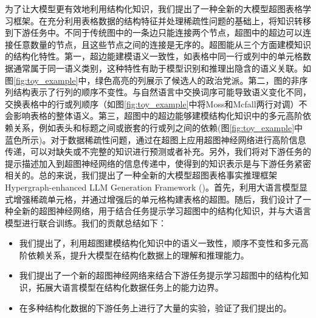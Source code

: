 \begin{CJK}{UTF8}{gkai}
为了让大模型更有效地利用结构化知识，我们提出了一种全新的大模型超图表格学习框架。在充分利用表格数据的结构特征并处理稀疏性问题的基础上，将知识转移到下游任务中。不同于传统图中的一条边只能连接两个节点，超图中的超边可以连接任意数量的节点，且这些节点之间的连接是无序的。超图能从三个方面建模知识的结构化特性。第一，超边能建模语义一致性，如表格中同一行或列中的单元格数据通常属于同一语义类别，这种特性有助于模型识别和推理出隐含的语义关联。如图\ref{fig:toy_example}中，绿色高亮的列展示了候选人的政治党派。第二，图的非序列结构表示了行列的顺序不变性。与自然语言中交换词序可能导致语义变化不同，交换表格中的行或列顺序（如图\ref{fig:toy_example}中将Moss和Mcfall两行对调）不会影响表格的整体语义。第三，超图中的超边能够建模结构化知识中的多元高阶依赖关系，例如表头和标题之间或嵌套的行或列之间的依赖(图\ref{fig:toy_example}中蓝色所示)。对于数据稀疏性问题，通过在超图上应用超图神经网络进行高阶信息传递，可以对缺失或不完整的知识进行预测或者补充。另外，我们将对下游任务的提示描述加入到超图神经网络的信息传递中，使得到的知识表示是与下游任务紧密相关的。总的来说，我们提出了一种全新的大模型超图表格事实推理框架Hypergraph-enhanced LLM Generation Framework (\name)。首先，利用大语言模型显式增强稀疏单元格，并通过增强后的单元格构建表格的超图。随后，我们设计了一种全新的超图神经网络，用于结合任务提示学习超图中的结构化知识，并与大语言模型进行联合训练。我们的贡献总结如下：

\begin{itemize}
    \item 我们提出了，利用超图建模结构化知识中的语义一致性，顺序不变性和多元高阶依赖关系，提升大模型在结构化数据上的理解和推理能力。
    \item 我们提出了一个新的超图神经网络来结合下游任务提示学习超图中的结构化知识，拓展大语言模型在结构化数据任务上的能力边界。
    \item 在多种结构化数据的下游任务上进行了大量的实验，验证了我们提出的。
\end{itemize}



\end{CJK}